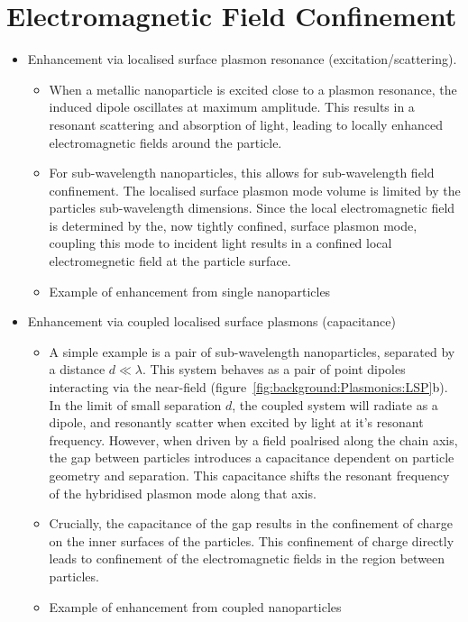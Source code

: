 \section{Electromagnetic Field Confinement}\label{sec:Plasmonics:confinement}
\begin{itemize}
    \item Enhancement via localised surface plasmon resonance (excitation/scattering). 
    \begin{itemize}
        \item When a metallic nanoparticle is excited close to a plasmon resonance, the induced dipole oscillates at maximum amplitude. This results in a resonant scattering and absorption of light, leading to locally enhanced electromagnetic fields around the particle. 
        \item For sub-wavelength nanoparticles, this allows for sub-wavelength field confinement. The localised surface plasmon mode volume is limited by the particles sub-wavelength dimensions. Since the local electromagnetic field is determined by the, now tightly confined, surface plasmon mode, coupling this mode to incident light results in a confined local electromegnetic field at the particle surface.
        \item Example of enhancement from single nanoparticles
    \end{itemize}
    \item Enhancement via coupled localised surface plasmons (capacitance)
        \begin{itemize}
            \item A simple example is a pair of sub-wavelength nanoparticles, separated by a distance $d \ll \lambda$. This system behaves as a pair of point dipoles interacting via the near-field (figure~\ref{fig:background:Plasmonics:LSP}b). In the limit of small separation $d$, the coupled system will radiate as a dipole, and resonantly scatter when excited by light at it's resonant frequency. However, when driven by a field poalrised along the chain axis, the gap between particles introduces a capacitance dependent on particle geometry and separation. This capacitance shifts the resonant frequency of the hybridised plasmon mode along that axis.
            \item Crucially, the capacitance of the gap results in the confinement of charge on the inner surfaces of the particles. This confinement of charge directly leads to confinement of the electromagnetic fields in the region between particles.
            \item Example of enhancement from coupled nanoparticles

\end{itemize}
\end{itemize}
